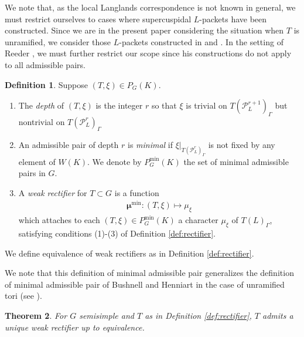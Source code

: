 \documentclass{compositio}
\theoremstyle{plain}
\newtheorem{theorem}{Theorem}[section]
\theoremstyle{definition}
\newtheorem{definition}[theorem]{Definition}
\newcommand{\PL}{\mathcal{P}_L}
\newcommand{\Pmin}{P_G^{\min}}
\newcommand{\bmu}{\boldsymbol\mu}
\newcommand{\mumin}{\bmu^{\min}}
\begin{document}
We note that, as the local Langlands correspondence is not known in general, we must restrict
ourselves to cases where supercuspidal $L$-packets have been constructed.
Since we are in the present paper considering the situation when $T$ is unramified,
we consider those $L$-packets constructed in \cite{reeder-debacker:09a} and \cite{reeder:08a}.
In the setting of Reeder \cite{reeder:08a},
we must further restrict our scope since his constructions do not apply to all admissible pairs.

\begin{definition}\label{def:general_pair}
Suppose $(T, \xi) \in P_G(K)$.
\begin{enumerate}
\item The \emph{depth} of $(T, \xi)$ is the integer $r$ so that $\xi$
is trivial on $T(\PL^{r+1})_{\Gamma}$ but nontrivial on
$T(\PL^{r})_{\Gamma}$
\item An admissible pair of depth $r$ is \emph{minimal}
if $\xi|_{T(\PL^{r})_{\Gamma}}$
is not fixed by any element of $W(K)$.
We denote by $\Pmin(K)$ the set
of minimal admissible pairs in $G$.
\item A \emph{weak rectifier} for $T \subset G$ is a function
\begin{align*}
\mumin : (T, \xi) \mapsto \mu_{\xi}
\end{align*}
which attaches to each $(T, \xi) \in \Pmin(K)$ a character
  $\mu_{\xi}$ of $T(L)_{\Gamma}$, satisfying conditions (1)-(3)
  of Definition \ref{def:rectifier}.
\end{enumerate}
We define equivalence of weak rectifiers as in Definition \ref{def:rectifier}.
\end{definition}

We note that this definition of minimal admissible pair generalizes
the definition of minimal admissible pair of Bushnell and Henniart in
the case of unramified tori (see \cite[\S2.2]{bushnell-henniart:05a}).

\begin{theorem} \label{thm:unique_semisimple}
For $G$ semisimple and $T$ as in Definition \ref{def:rectifier}, $T$ admits a unique weak rectifier up to equivalence.
\end{theorem}
\end{document}
